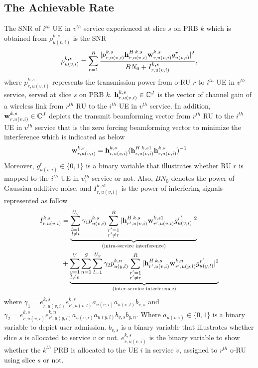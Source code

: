 \documentclass[conference]{IEEEtran}
\begin{document}
\subsection{The Achievable Rate}
The SNR of $i^{th}$ UE in $v^{th}$ service experienced at slice $s$ on PRB $k$ which is obtained from
 $\rho_{u(v,i)}^{k,s}$ is the SNR 
\begin{equation}\label{eq2}
\rho_{u(v,i)}^{k,s} =  \sum_{r=1}^{R}\frac{|p_{r,u(v,i)}^{k,s}{\bold{h}_{r,u(v,i)}^{H \: k,s}} \bold{w}_{r,u(v,i)}^{k,s} g_{u(v,i)}^r|^2}{BN_0 + I_{r,u(v,i)}^{k,s}},
\end{equation} 
where $p_{r,u(v,i)}^{k,s}$ represents the transmission power from o-RU $r$ to $i^{th}$ UE in $v^{th}$ service, served at slice $s$ on PRB $k$. 
${\bold{h}_{r,u(v,i)}^{k,s}} \in \mathbb{C}^{J}$ is the vector of channel gain of a wireless link from 
$r^{th}$ RU to the $i^{th}$ UE in $v^{th}$ service. In addition, $\bold{w}_{r,u(v,i)}^{k,s} \in \mathbb{C}^{J}$ depicts the  transmit beamforming vector from $r^{th}$ RU to the $i^{th}$ UE in $v^{th}$ service that is the zero forcing beamforming vector to minimize the interference which is indicated as below
\begin{equation}
\bold{w}_{r,u(v,i)}^{k,s} = {\bold{h}_{r,u(v,i)}^{k,s}}({\bold{h}_{r,u(v,i)}^{H \: k,s1}} {\bold{h}_{r,u(v,i)}^{k,s}})^{-1}
\end{equation}
Moreover, $g_{u(v,i)}^r \in \{0,1\}$ is a binary variable that illustrates whether RU $r$ is mapped to the $i^{th}$ UE in $v_{1}^{th}$ service or not. 
Also, $BN_0$ denotes the power of Gaussian additive noise, and $I_{r,u(v,i)}^{k,s1}$ is the power of interfering signals represented as follow
\begin{equation}
\begin{split}
I_{r,u(v,i)}^{k,s} &=
 \underbrace{\sum_{\substack{l=1 \\ l\neq i}}^{{U}_{v}} \gamma_{1}  p_{u(v,i)}^{k,s}\sum_{\substack{r'=1 \\ r'\neq r}}^{R}|{\bold{h}_{r',u(v,i)}^{H \: k,s}} \bold{w}_{r',u(v,i)}^{k,s1} g_{u(v,i)}^{r'}|^2}_{\text{(intra-service interference)}}\\
&+ \underbrace{\sum_{\substack{y=1 \\ l\neq v}}^{V}\sum_{n=1}^{S}\sum_{l=1}^{{U}_y} \gamma_{2}  p_{u(y,l)}^{k,n}\sum_{\substack{r'=1 \\ r'\neq r}}^{R}|{\bold{h}_{r',u(v,i)}^{H \: k,s}} \bold{w}_{r',u(y,l)}^{k,n} g_{u(y,l)}^{r'}|^2}_{\text{(inter-service interference)}}\\
\end{split}
\end{equation}
where $\gamma_{1} = e^{k,s}_{r,u(v,i)}e^{k,s}_{r',u(v,l)}a_{u(v,i)}a_{u(v,l)} b_{v, s} $
and $\gamma_{2} = e^{k,s}_{r,u(v,i)}e^{k,n}_{r',u(y,l)}a_{u(v,i)}a_{u(y,l)} b_{v, s} b_{y,n} $.
Where $a_{u(v,i)} \in \{0,1\}$ is a binary variable to depict user admission.
$b_{v, s}$ is a binary variable that illustrates whether slice $s$ is allocated to service $v$ or not. 
$e^{k,s}_{r,u(v,i)}$ is the binary variable to show whether the $k^{th}$ PRB is allocated to the UE $i$ in service $v$, assigned to $r^{th}$ o-RU using slice $s$ or not.
\end{document}

